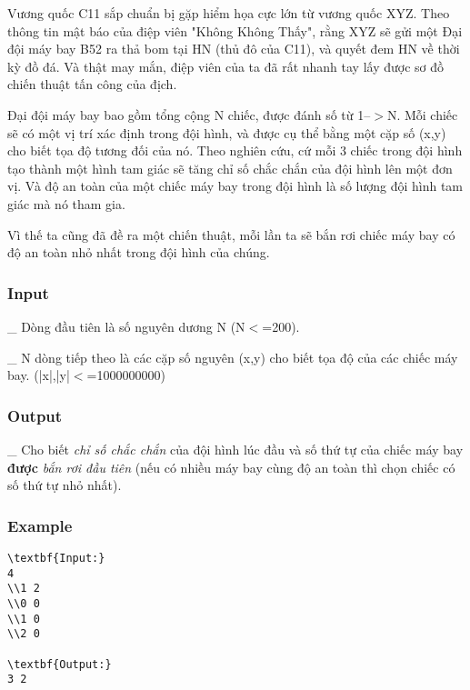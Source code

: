 



   Vương quốc C11 sắp chuẩn bị gặp hiểm họa cực lớn từ vương quốc XYZ. Theo thông tin mật báo của điệp viên "Không Không Thấy", rằng XYZ sẽ gửi một Đại đội máy bay B52 ra thả bom tại HN (thủ đô của C11), và quyết đem HN về thời kỳ đồ đá. Và thật may mắn, điệp viên của ta đã rất nhanh tay lấy được sơ đồ chiến thuật tấn công của địch.  

   Đại đội máy bay bao gồm tổng cộng N chiếc, được đánh số từ 1--$>$N. Mỗi chiếc sẽ có một vị trí xác định trong đội hình, và được cụ thể bằng một cặp số (x,y) cho biết tọa độ tương đối của nó. Theo nghiên cứu, cứ mỗi 3 chiếc trong đội hình tạo thành một hình tam giác sẽ tăng chỉ số chắc chắn của đội hình lên một đơn vị. Và độ an toàn của một chiếc máy bay trong đội hình là số lượng đội hình tam giác mà nó tham gia.  

   Vì thế ta cũng đã đề ra một chiến thuật, mỗi lần ta sẽ bắn rơi chiếc máy bay có độ an toàn nhỏ nhất trong đội hình của chúng.  

\subsubsection{   Input  }

   \_ Dòng đầu tiên là số nguyên dương N (N$<$=200).  

   \_ N dòng tiếp theo là các cặp số nguyên (x,y) cho biết tọa độ của các chiếc máy bay. (|x|,|y|$<$=1000000000)  

\subsubsection{   Output  }

   \_ Cho biết   \emph{    chỉ số chắc chắn   }   của đội hình lúc đầu và số thứ tự của chiếc máy bay   \textbf{    được   }\emph{    bắn rơi đầu tiên   }   (nếu có nhiều máy bay cùng độ an toàn thì chọn chiếc có số thứ tự nhỏ nhất).  

\subsubsection{   Example  }
\begin{verbatim}
\textbf{Input:}
4
\\1 2
\\0 0 
\\1 0
\\2 0

\textbf{Output:}
3 2
\end{verbatim}
